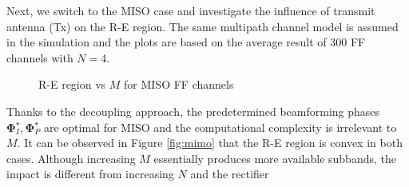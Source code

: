 Next, we switch to the MISO case and investigate the influence of transmit antenna (Tx) on the R-E region. The same multipath channel model is assumed in the simulation and the plots are based on the average result of 300 FF channels with $N = 4$.

\begin{figure}[ht]
  \centering
  \caption{R-E region vs $M$ for MISO FF channels}
  \label{fig:re-miso}
\end{figure}

Thanks to the decoupling approach, the predetermined beamforming phases ${\mathbf{\Phi }}_I^ \star ,{\mathbf{\Phi }}_P^ \star $ are optimal for MISO and the computational complexity is irrelevant to $M$. It can be observed in Figure \ref{fig:mimo} that the R-E region is convex in both cases. Although increasing $M$ essentially produces more available subbands, the impact is different from increasing $N$ and the rectifier 